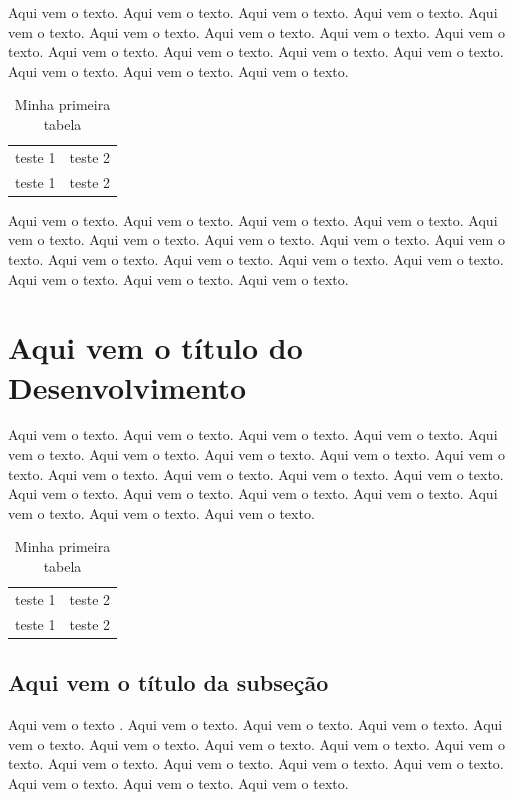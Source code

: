 \documentclass[a4paper, 12pt]{article}
\begin{document}
Aqui vem o texto. Aqui vem o texto. Aqui vem o texto. Aqui vem o texto. 
Aqui vem o texto. Aqui vem o texto. Aqui vem o texto. Aqui vem o texto. 
Aqui vem o texto. Aqui vem o texto. Aqui vem o texto. Aqui vem o texto. 
Aqui vem o texto. Aqui vem o texto. Aqui vem o texto. Aqui vem o texto. 

\begin{table}[htb]
    \centering
    \begin{tabular}{|c|c|}
        teste 1 & teste 2 \\
        teste 1 & teste 2 \\
    \end{tabular}
    \caption{Minha primeira tabela}
    \label{minha-tabela}
\end{table}

Aqui vem o texto. Aqui vem o texto. Aqui vem o texto. Aqui vem o texto. 
Aqui vem o texto. Aqui vem o texto. Aqui vem o texto. Aqui vem o texto. 
Aqui vem o texto. Aqui vem o texto. Aqui vem o texto. Aqui vem o texto. 
Aqui vem o texto. Aqui vem o texto. Aqui vem o texto. Aqui vem o texto. 

\section{Aqui vem o título do Desenvolvimento} 

Aqui vem o texto. Aqui vem o texto. Aqui vem o texto. Aqui vem o texto. 
Aqui vem o texto. Aqui vem o texto. Aqui vem o texto. Aqui vem o texto. 
Aqui vem o texto. Aqui vem o texto. Aqui vem o texto. Aqui vem o texto. 
Aqui vem o texto. Aqui vem o texto. Aqui vem o texto. Aqui vem o texto. 
Aqui vem o texto. Aqui vem o texto. Aqui vem o texto. Aqui vem o texto. 

\begin{table}[htb]
    \centering
    \begin{tabular}{|c|c|}
        teste 1 & teste 2 \\
        teste 1 & teste 2 \\
    \end{tabular}
    \caption{Minha primeira tabela}
    \label{minha-outra-tabela}
\end{table}

\subsection{Aqui vem o título da subseção}

Aqui vem o texto \cite{meuartigo}. Aqui vem o texto. Aqui vem o texto. Aqui vem o texto. 
Aqui vem o texto. Aqui vem o texto. Aqui vem o texto. Aqui vem o texto. 
Aqui vem o texto. Aqui vem o texto. Aqui vem o texto. Aqui vem o texto. 
Aqui vem o texto. Aqui vem o texto. Aqui vem o texto. Aqui vem o texto. 
\end{document}
